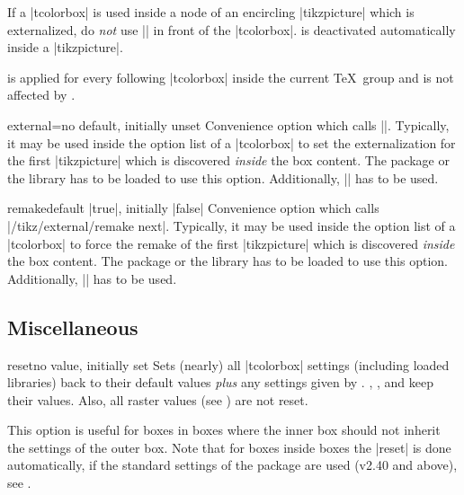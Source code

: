 \begin{marker}
If a |tcolorbox| is used inside a node of an encircling |tikzpicture| which is externalized,
do \emph{not} use |\tikzexternaldisable| in front of the |tcolorbox|.
 is deactivated automatically inside a |tikzpicture|.
\end{marker}

\begin{marker}
 is applied for every following |tcolorbox|
inside the current \TeX\ group and is not affected by .
\end{marker}

\begin{docTcbKey}{external}{=}{no default, initially unset}
  Convenience option which calls ||. Typically,
  it may be used inside the option list of a |tcolorbox| to set the
  externalization  for the first |tikzpicture| which is discovered
  \emph{inside} the box content.
  The package  \cite{tantau:tikz_and_pgf} or the library  has to be loaded to use this option.
  Additionally, |\usetikzlibrary{external}| has to be used.
\end{docTcbKey}

\begin{docTcbKey}{remake}{}{default |true|, initially |false|}
  Convenience option which calls |/tikz/external/remake next|. Typically,
  it may be used inside the option list of a |tcolorbox| to force the remake
  of the first |tikzpicture| which is discovered \emph{inside} the box content.
  The package  \cite{tantau:tikz_and_pgf} or the library  has to be loaded to use this option.
  Additionally, |\usetikzlibrary{external}| has to be used.
\end{docTcbKey}


\clearpage
\subsection{Miscellaneous}
\begin{docTcbKey}{reset}{}{no value, initially set}
Sets (nearly) all |tcolorbox| settings (including loaded libraries) back to their default values
\emph{plus} any settings given by .
, , and
 keep their values.
Also, all raster values (see ) are not reset.

This option is useful for boxes in boxes where the inner box should not inherit
the settings of the outer box.
Note that for boxes inside boxes the |reset| is done automatically, if the
standard settings of the package are used (v2.40 and above), see
.
\end{docTcbKey}




